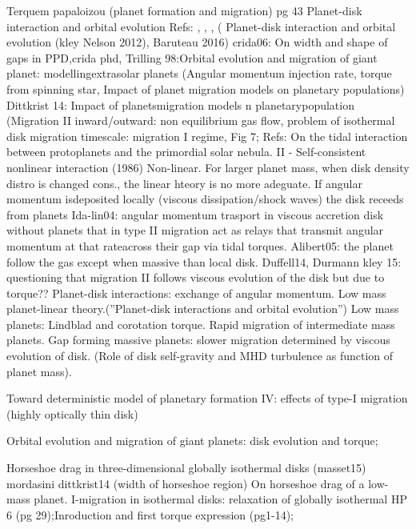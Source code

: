 \begin{workout}
Terquem papaloizou (planet formation and migration) pg 43
Planet-disk interaction and orbital evolution
Refs: \cite{ward1997protoplanet}, \cite{terquem2000disks}, \cite{menou2004low}, (
Planet-disk interaction and orbital evolution (kley Nelson 2012), 
Baruteau 2016)
crida06: On width and shape of gaps in PPD,crida phd, 
Trilling 98:Orbital evolution and migration of giant planet: modellingextrasolar planets (Angular momentum injection rate, torque from spinning star, Impact of planet migration models on planetary populations)
Dittkrist 14: Impact of planetsmigration models n planetarypopulation (Migration II inward/outward: non equilibrium gas flow, problem of isothermal disk migration timescale: migration I regime, Fig 7;
Refs: On the tidal interaction between protoplanets and the primordial solar nebula. II - Self-consistent nonlinear interaction (1986)
Non-linear. For larger planet mass, when disk density distro is changed cons., the linear hteory is no more adeguate. If angular momentum isdeposited locally (viscous dissipation/shock waves)  the disk receeds from planets
Ida-lin04: angular momentum trasport in viscous accretion disk without planets that in type II migration act as relays that transmit angular momentum at that rateacross their gap via tidal torques.
Alibert05: the planet follow the gas except when massive than local disk.
Duffell14, Durmann kley 15: questioning that migration II follows viscous evolution of the disk but due to torque??
Planet-disk interactions: exchange of angular momentum. Low mass planet-linear theory.(''Planet-disk interactions and orbital evolution'')
Low mass planets: Lindblad and corotation torque. Rapid migration of intermediate mass planets. Gap forming massive planets: slower migration determined by viscous evolution of disk. (Role of disk self-gravity and MHD turbulence as function of planet mass).
\end{workout}

\begin{workout}
Toward deterministic model of planetary formation IV: effects of type-I migration (highly optically thin disk)
\end{workout}

\begin{workout}
Orbital evolution and migration of giant planets: disk evolution and torque;
\end{workout}

\begin{workout}
Horseshoe drag in three-dimensional globally isothermal disks (masset15)
mordasini dittkrist14 (width of horseshoe region)
On horseshoe drag of a low-mass planet. I-migration in isothermal disks: relaxation of globally isothermal HP 6 (pg 29);Inroduction and first torque expression (pg1-14); 
\end{workout}

